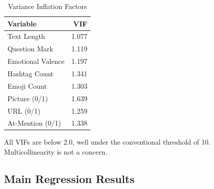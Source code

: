 \documentclass[12pt,a4paper]{article}
\begin{document}
\begin{table}[H]
\centering
\caption{Variance Inflation Factors}
\small
\begin{tabular}{lr}
\toprule
Variable & VIF \\
\midrule
Text Length & 1.077 \\
Question Mark & 1.119 \\
Emotional Valence & 1.197 \\
Hashtag Count & 1.341 \\
Emoji Count & 1.303 \\
Picture (0/1) & 1.639 \\
URL (0/1) & 1.259 \\
At-Mention (0/1) & 1.338 \\
\bottomrule
\end{tabular}
\end{table}

All VIFs are below 2.0, well under the conventional threshold of 10. Multicollinearity is not a concern.

\subsection{Main Regression Results}
\end{document}
